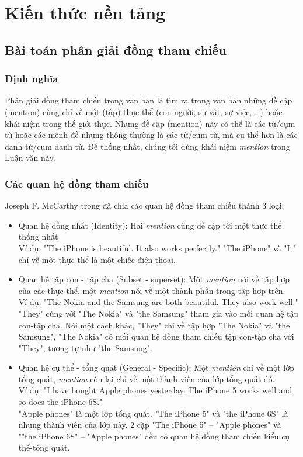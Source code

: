 \documentclass[12pt]{report}
\begin{document}
	\chapter{Kiến thức nền tảng}	
		\section{Bài toán phân giải đồng tham chiếu}			
			\label{coref_problem}
			\subsection*{Định nghĩa}
				Phân giải đồng tham chiếu trong văn bản là tìm ra trong văn bản những đề cập (mention) cùng chỉ về một (tập) thực thể (con người, sự vật, sự việc, …) hoặc khái niệm trong thế giới thực. Những đề cập (mention) này có thể là các từ/cụm từ hoặc các mệnh đề nhưng thông thường là các từ/cụm từ, mà cụ thể hơn là các danh từ/cụm danh từ. Để thống nhất, chúng tôi dùng khái niệm \textit{mention} trong Luận văn này.
			\subsection*{Các quan hệ đồng tham chiếu}		
				Joseph F. McCarthy trong \cite{corefdef} đã chia các quan hệ đồng tham chiếu thành 3 loại: 
				\begin{itemize}
					\item{Quan hệ đồng nhất (Identity): Hai \textit{mention} cùng đề cập tới một thực thể thống nhất\\
					Ví dụ: "The iPhone is beautiful. It also works perfectly."
					"The iPhone" và "It" chỉ về một thực thể là một chiếc điện thoại.}
					\item{Quan hệ tập con - tập cha (Subset - superset): Một \textit{mention} nói về tập hợp của các thực thể, một \textit{mention} nói về một thành phần trong tập hợp trên.\\
					Ví dụ: "The Nokia and the Samsung are both beautiful. They also work well."\\
					"They" cùng với "The Nokia" và "the Samsung" tham gia vào mối quan hệ tập con-tập cha. Nói một cách khác, "They" chỉ về tập hợp "The Nokia" và "the Samsung", "The Nokia" có mối quan hệ đồng tham chiếu tập con-tập cha với "They", tương tự như "the Samsung".}
					\item{Quan hệ cụ thể - tổng quát (General - Specific): Một \textit{mention} chỉ về một lớp tổng quát, \textit{mention} còn lại chỉ về một thành viên của lớp tổng quát đó.\\
					Ví dụ: "I have bought Apple phones yesterday. The iPhone 5 works well and so does the iPhone 6S."\\
					"Apple phones" là một lớp tổng quát. "The iPhone 5" và "the iPhone 6S" là những thành viên của lớp này. 2 cặp "The iPhone 5" – "Apple phones" và ""the iPhone 6S" – "Apple phones" đều có quan hệ đồng tham chiếu kiểu cụ thể-tổng quát.}
				\end{itemize}
\end{document}
